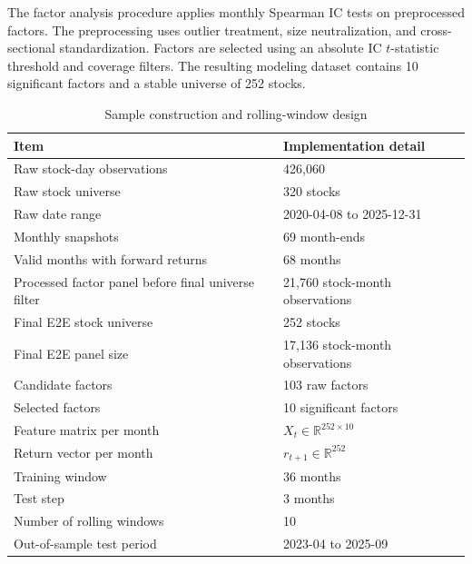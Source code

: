 \documentclass[11pt]{article}
\begin{document}
The factor analysis procedure applies monthly Spearman IC tests on preprocessed factors. The preprocessing uses outlier treatment, size neutralization, and cross-sectional standardization. Factors are selected using an absolute IC $t$-statistic threshold and coverage filters. The resulting modeling dataset contains 10 significant factors and a stable universe of 252 stocks.

\begin{table}[t]
\centering
\caption{Sample construction and rolling-window design}
\label{tab:data_summary}
\begin{tabular}{ll}
\toprule
Item & Implementation detail \\
\midrule
Raw stock-day observations & 426,060 \\
Raw stock universe & 320 stocks \\
Raw date range & 2020-04-08 to 2025-12-31 \\
Monthly snapshots & 69 month-ends \\
Valid months with forward returns & 68 months \\
Processed factor panel before final universe filter & 21,760 stock-month observations \\
Final E2E stock universe & 252 stocks \\
Final E2E panel size & 17,136 stock-month observations \\
Candidate factors & 103 raw factors \\
Selected factors & 10 significant factors \\
Feature matrix per month & $X_t\in\mathbb{R}^{252\times 10}$ \\
Return vector per month & $r_{t+1}\in\mathbb{R}^{252}$ \\
Training window & 36 months \\
Test step & 3 months \\
Number of rolling windows & 10 \\
Out-of-sample test period & 2023-04 to 2025-09 \\
\bottomrule
\end{tabular}
\end{table}
\end{document}
